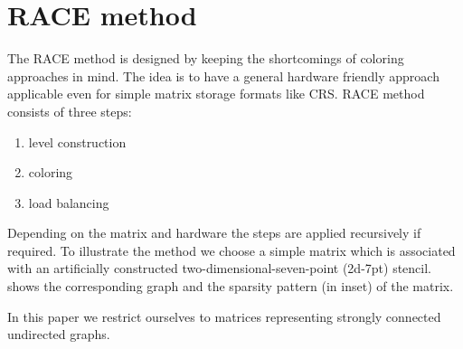 \section{RACE method} \label{sec:RACE_method}
The \acrshort{RACE} method is designed by  keeping the shortcomings
of coloring approaches in mind. The idea is to have a general hardware 
friendly approach applicable even for simple matrix storage formats 
like \acrshort{CRS}.
\Acrshort{RACE} method consists of three steps:
\begin{enumerate}
	\item level construction
	\item \DK coloring
	\item load balancing
\end{enumerate}
Depending on the matrix and hardware the steps are applied recursively 
if required. 
To illustrate the method we choose a
simple matrix which is associated with an artificially constructed
two-dimensional-seven-point (2d-7pt) stencil.  shows
the corresponding graph and the sparsity pattern (in inset) of the matrix.

In this paper we restrict ourselves to matrices representing strongly connected 
undirected graphs.

